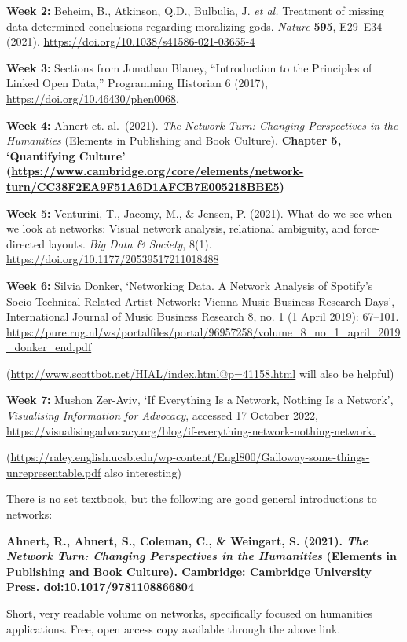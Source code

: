 \documentclass[
]{book}
\begin{document}
\textbf{Week 2:} Beheim, B., Atkinson, Q.D., Bulbulia, J. \emph{et al.} Treatment
of missing data determined conclusions regarding moralizing gods.
\emph{Nature} \textbf{595}, E29--E34 (2021).
\url{https://doi.org/10.1038/s41586-021-03655-4}

\textbf{Week 3:} Sections from Jonathan Blaney, ``Introduction to the Principles of Linked Open Data,'' Programming Historian 6 (2017), \url{https://doi.org/10.46430/phen0068}.

\textbf{Week 4:} Ahnert et. al.~(2021). \emph{The Network Turn: Changing
Perspectives in the Humanities} (Elements in Publishing and Book
Culture). \textbf{Chapter 5, `Quantifying Culture'
(\url{https://www.cambridge.org/core/elements/network-turn/CC38F2EA9F51A6D1AFCB7E005218BBE5})}

\textbf{Week 5:} Venturini, T., Jacomy, M., \& Jensen, P. (2021). What do we
see when we look at networks: Visual network analysis, relational
ambiguity, and force-directed layouts. \emph{Big Data \& Society}, 8(1).
\url{https://doi.org/10.1177/20539517211018488}

\textbf{Week 6:} Silvia Donker, `Networking Data. A Network Analysis of
Spotify's Socio-Technical Related Artist Network: Vienna Music Business
Research Days', International Journal of Music Business Research 8, no.
1 (1 April 2019): 67--101.
\url{https://pure.rug.nl/ws/portalfiles/portal/96957258/volume_8_no_1_april_2019_donker_end.pdf}

(\url{http://www.scottbot.net/HIAL/index.html@p=41158.html}
will also be helpful)

\textbf{Week 7:} Mushon Zer-Aviv, `If Everything Is a Network, Nothing Is a
Network', \emph{Visualising Information for Advocacy}, accessed 17 October
2022,
\url{https://visualisingadvocacy.org/blog/if-everything-network-nothing-network.}

(\url{https://raley.english.ucsb.edu/wp-content/Engl800/Galloway-some-things-unrepresentable.pdf}
also interesting)

There is no set textbook, but the following are good general
introductions to networks:

\textbf{Ahnert, R., Ahnert, S., Coleman, C., \& Weingart, S. (2021). \emph{The
Network Turn: Changing Perspectives in the Humanities} (Elements in
Publishing and Book Culture). Cambridge: Cambridge University Press.
\url{doi:10.1017/9781108866804}}

Short, very readable volume on networks, specifically focused on
humanities applications. Free, open access copy available through the
above link.
\end{document}
